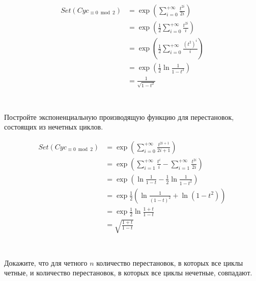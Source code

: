 \begin{align*}
    Set(Cyc_{\equiv 0\bmod 2}) & = \exp\left( \sum_{i = 0}^{+\infty} \frac{t^{2i}}{2i} \right)            \\
                               & = \exp\left( \frac{1}{2}\sum_{i = 0}^{+\infty} \frac{t^{2i}}{i} \right)  \\
                               & = \exp\left( \frac{1}{2}\sum_{i = 0}^{+\infty} \frac{(t^2)^i}{i} \right) \\
                               & = \exp\left( \frac{1}{2} \ln \frac{1}{1 - t^2} \right)                   \\
                               & = \frac{1}{\sqrt{1 - t^2}}                                               \\
\end{align*}

\section{}
Постройте экспоненциальную производящую функцию для перестановок, состоящих из нечетных циклов.

\begin{align*}
    Set(Cyc_{\equiv 0\bmod 2})
     & = \exp\left( \sum_{i = 0}^{+\infty} \frac{t^{2i + 1}}{2i + 1} \right)                                \\
     & = \exp\left( \sum_{i = 1}^{+\infty} \frac{t^i}{i} - \sum_{i = 1}^{+\infty} \frac{t^{2i}}{2i} \right) \\
     & = \exp\left( \ln \frac{1}{1 - t} - \frac{1}{2} \ln \frac{1}{1 - t^2} \right)                         \\
     & = \exp \frac{1}{2}\left( \ln \frac{1}{(1 - t)^2} + \ln (1 - t^2) \right)                             \\
     & = \exp \frac{1}{2} \ln \frac{1 + t}{1 - t}                                                           \\
     & = \sqrt{\frac{1 + t}{1 - t}}                                                                         \\
\end{align*}

\section{}
Докажите, что для четного \(n\) количество перестановок, в которых все циклы четные, и количество перестановок, в которых все циклы нечетные, совпадают.

